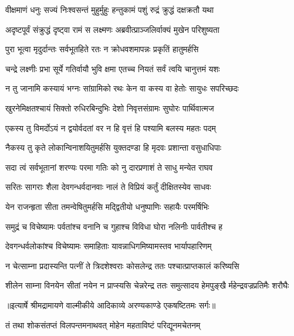 \twolineshloka
{वीक्षमाणं धनुः सज्यं निःश्वसन्तं मुहुर्मुहुः}
{हन्तुकामं पशुं रुद्रं क्रुद्धं दक्षक्रतौ यथा} %

\twolineshloka
{अदृष्टपूर्वं संक्रुद्धं दृष्ट्वा रामं स लक्ष्मणः}
{अब्रवीत्प्राञ्जलिर्वाक्यं मुखेन परिशुष्यता} %

\twolineshloka
{पुरा भूत्वा मृदुर्दान्तः सर्वभूतहिते रतः}
{न क्रोधवशमापन्नः प्रकृतिं हातुमर्हसि} %

\twolineshloka
{चन्द्रे लक्ष्णीः प्रभा सूर्ये गतिर्वायौ भुवि क्षमा}
{एतच्च नियतं सर्वं त्वयि चानुत्तमं यशः} %

\twolineshloka
{न तु जानामि कस्यायं भग्नः सांग्रामिको रथः}
{केन वा कस्य वा हेतोः सायुधः सपरिच्छदः} %

\twolineshloka
{खुरनेमिक्षतश्चायं सिक्तो रुधिरबिन्दुभिः}
{देशो निवृत्तसंग्रामः सुघोरः पार्थिवात्मज} %

\twolineshloka
{एकस्य तु विमर्दोऽयं न द्वयोर्वदतां वर}
{न हि वृत्तं हि पश्यामि बलस्य महतः पदम्} %

\twolineshloka
{नैकस्य तु कृते लोकान्विनाशयितुमर्हसि}
{युक्तदण्डा हि मृदवः प्रशान्ता वसुधाधिपाः} %

\twolineshloka
{सदा त्वं सर्वभूतानां शरण्यः परमा गतिः}
{को नु दारप्रणाशं ते साधु मन्येत राघव} %

\twolineshloka
{सरितः सागराः शैला देवगन्धर्वदानवाः}
{नालं ते विप्रियं कर्तुं दीक्षितस्येव साधवः} %

\twolineshloka
{येन राजन्हृता सीता तमन्वेषितुमर्हसि}
{मद्द्वितीयो धनुष्पाणिः सहायैः परमर्षिभिः} %

\twolineshloka
{समुद्रं च विचेष्यामः पर्वतांश्च वनानि च}
{गुहाश्च विविधा घोरा नलिनीः पार्वतीश्च ह} %

\twolineshloka
{देवगन्धर्वलोकांश्च विचेष्यामः समाहिताः}
{यावन्नाधिगमिष्यामस्तव भार्यापहारिणम्} %

\twolineshloka
{न चेत्साम्ना प्रदास्यन्ति पत्नीं ते त्रिदशेश्वराः}
{कोसलेन्द्र ततः पश्चात्प्राप्तकालं करिष्यसि} %

\fourlineindentedshloka
{शीलेन साम्ना विनयेन सीतां}
{ नयेन न प्राप्स्यसि चेन्नरेन्द्र}
{ततः समुत्सादय हेमपुङ्खै}
{र्महेन्द्रवज्रप्रतिमैः शरौघैः} %


{॥इत्यार्षे श्रीमद्रामायणे वाल्मीकीये आदिकाव्ये अरण्यकाण्डे एकषष्टितमः सर्गः॥}


\twolineshloka
{तं तथा शोकसंतप्तं विलपन्तमनाथवत्}
{मोहेन महताविष्टं परिद्यूनमचेतनम्} %


